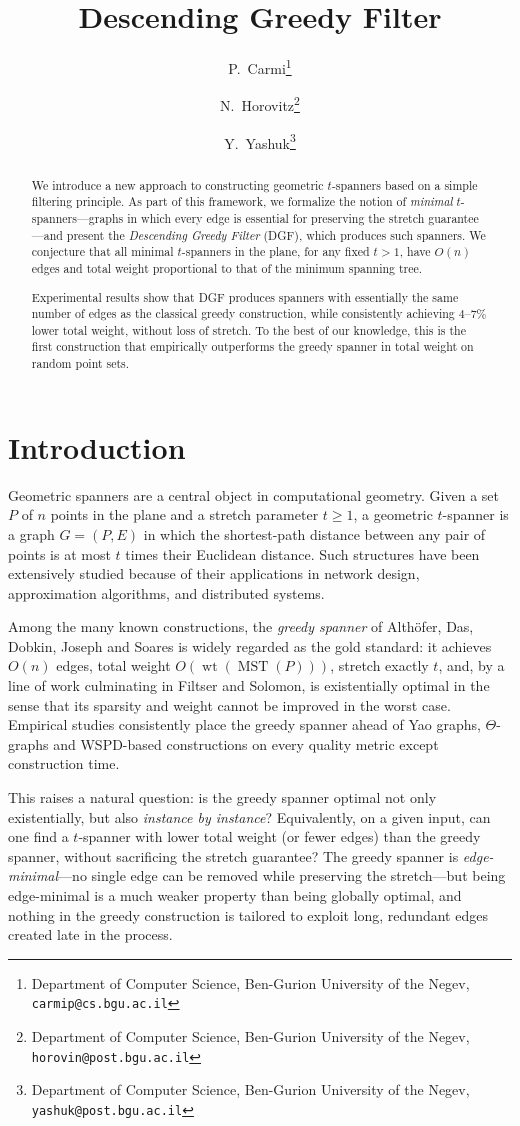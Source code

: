 \documentclass{cccg26}
\title{Descending Greedy Filter}
\author{P.~Carmi\thanks{Department of Computer Science, Ben-Gurion University of the Negev, \texttt{carmip@cs.bgu.ac.il}}
	\and
	N.~Horovitz\thanks{Department of Computer Science, Ben-Gurion University of the Negev, \texttt{horovin@post.bgu.ac.il}}
	\and
	Y.~Yashuk\thanks{Department of Computer Science, Ben-Gurion University of the Negev, \texttt{yashuk@post.bgu.ac.il}}}
\DeclareMathOperator{\wt}{wt}
\DeclareMathOperator{\MST}{MST}
\begin{document}
\thispagestyle{empty}
\maketitle


\begin{abstract}
We introduce a new approach to constructing geometric $t$-spanners based on a simple filtering principle. As part of this framework, we formalize the notion of \emph{minimal} $t$-spanners---graphs in which every edge is essential for preserving the stretch guarantee---and present the \emph{Descending Greedy Filter} (DGF), which produces such spanners.
We conjecture that all minimal $t$-spanners in the plane, for any fixed $t>1$, have $O(n)$ edges and total weight proportional to that of the minimum spanning tree.

Experimental results show that DGF produces spanners with essentially the same number of edges as the classical greedy construction, while consistently achieving $4$--$7\%$ lower total weight, without loss of stretch. To the best of our knowledge, this is the first construction that empirically outperforms the greedy spanner in total weight on random point sets.
\end{abstract}

\section{Introduction}
Geometric spanners are a central object in computational geometry. Given
a set $P$ of $n$ points in the plane and a stretch parameter $t\ge 1$, a
geometric $t$-spanner is a graph $G=(P,E)$ in which the shortest-path
distance between any pair of points is at most $t$ times their Euclidean
distance. Such structures have been extensively studied because of their
applications in network design, approximation algorithms, and distributed
systems.

Among the many known constructions, the \emph{greedy spanner} of
Alth\"ofer, Das, Dobkin, Joseph and Soares is widely regarded as the
gold standard: it achieves $O(n)$ edges, total weight
$O(\wt(\MST(P)))$, stretch exactly $t$, and, by a line of work
culminating in Filtser and Solomon, is existentially optimal in the
sense that its sparsity and weight cannot be improved in the worst
case. Empirical studies consistently place the greedy spanner ahead of
Yao graphs, $\Theta$-graphs and WSPD-based constructions on every
quality metric except construction time.

This raises a natural question: is the greedy spanner optimal not only
existentially, but also \emph{instance by instance}? Equivalently, on a
given input, can one find a $t$-spanner with lower total weight (or fewer
edges) than the greedy spanner, without sacrificing the
stretch guarantee? The greedy spanner is \emph{edge-minimal}---no
single edge can be removed while preserving the stretch---but being
edge-minimal is a much weaker property than being globally optimal, and
nothing in the greedy construction is tailored to exploit long,
redundant edges created late in the process.
\end{document}
